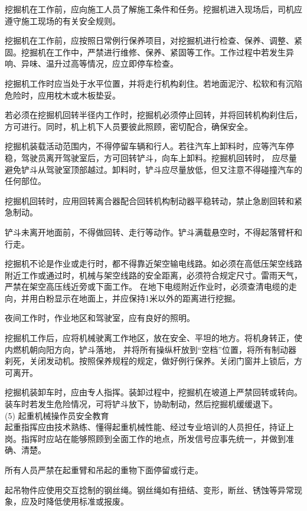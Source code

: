  挖掘机在工作前，应向施工人员了解施工条件和任务。挖掘机进入现场后，司机应遵守施工现场的有关安全规则。

 挖掘机在工作前，应按照日常例行保养项目，对挖掘机进行检查、保养、调整、紧固。挖掘机在工作中，严禁进行维修、保养、紧固等工作。工作过程中若发生异响、异味、温升过高等情况，应立即停车检查。

 挖掘机工作时应当处于水平位置，并将走行机构刹住。若地面泥泞、松软和有沉陷危险时，应用枕木或木板垫妥。

 若必须在挖掘机回转半径内工作时，挖掘机必须停止回转，并将回转机构刹住后，方可进行。同时，机上机下人员要彼此照顾，密切配合，确保安全。

 挖掘机装载活动范围内，不得停留车辆和行人。若往汽车上卸料时，应等汽车停稳，驾驶员离开驾驶室后，方可回转铲斗，向车上卸料。挖掘机回转时，
应尽量避免铲斗从驾驶室顶部越过。卸料时，铲斗应尽量放低，但又注意不得碰撞汽车的任何部位。

 挖掘机回转时，应用回转离合器配合回转机构制动器平稳转动，禁止急剧回转和紧急制动。

 铲斗未离开地面前，不得做回转、走行等动作。铲斗满载悬空时，不得起落臂杆和行走。

 挖掘机不论是作业或走行时，都不得靠近架空输电线路。如必须在高低压架空线路附近工作或通过时，机械与架空线路的安全距离，必须符合规定尺寸。雷雨天气，严禁在架空高压线近旁或下面工作。
在地下电缆附近作业时，必须查清电缆的走向，并用白粉显示在地面上，并应保持1米以外的距离进行挖掘。

 夜间工作时，作业地区和驾驶室，应有良好的照明。

 挖掘机工作后，应将机械驶离工作地区，放在安全、平坦的地方。将机身转正，使内燃机朝向阳方向，铲斗落地，
并将所有操纵杆放到“空档”位置，将所有制动器刹死，关闭发动机。按照保养规程的规定，做好例行保养。关闭门窗并上锁后，方可离开。

 挖掘机装卸车时，应由专人指挥。装卸过程中，挖掘机在坡道上严禁回转或转向。装车时若发生危险情况，可将铲斗放下，协助制动，然后挖掘机缓缓退下。\\


(5) 起重机械操作员安全教育\\

 起重指挥应由技术熟练、懂得起重机械性能、经过专业培训的人员担任，持证上岗。指挥时应站在能够照顾到全面工作的地点，所发信号应事先统一，并做到准确、清楚。

 所有人员严禁在起重臂和吊起的重物下面停留或行走。

 起吊物件应使用交互捻制的钢丝绳。钢丝绳如有扭结、变形，断丝、锈蚀等异常现象，应及时降低使用标准或报废。

